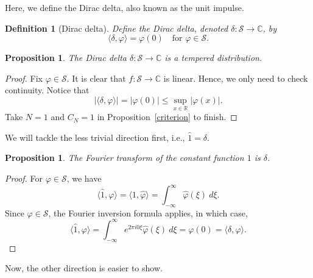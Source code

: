 \documentclass[12pt, letterpaper]{article}
\theoremstyle{plain}
\newtheorem{definition}[theorem]{Definition}
\newtheorem{proposition}[theorem]{Proposition}
\renewcommand{\phi}{\varphi}
\begin{document}
Here, we define the Dirac delta, also known as the unit impulse.

\begin{definition}[Dirac delta]
    Define the Dirac delta, denoted $\delta: \mathcal{S} \to \mathbb{C}$, by
    \begin{equation}
        \langle \delta, \phi \rangle = \phi(0) \quad \text{for } \phi \in \mathcal{S}.
    \end{equation}
\end{definition}

\begin{proposition}
    The Dirac delta $\delta: \mathcal{S} \to \mathbb{C}$ is a tempered distribution.
\end{proposition}

\begin{proof}
    Fix $\phi \in \mathcal{S}$. It is clear that $f: \mathcal{S} \to \mathbb{C}$ is linear. Hence, we only need to check continuity. Notice that
    \begin{equation}
        \vert \langle \delta, \phi \rangle \vert = \vert \phi(0) \vert \le \sup_{x \in \mathbb{R}} \vert \phi(x) \vert.
    \end{equation}
    Take $N = 1$ and $C_N = 1$ in Proposition~\ref{criterion} to finish.
\end{proof}

We will tackle the less trivial direction first, i.e., $\hat{1} = \delta$.

\begin{proposition}
    The Fourier transform of the constant function $1$ is $\delta$.
\end{proposition}

\begin{proof}
    For $\phi \in \mathcal{S}$, we have
    \begin{equation}
        \langle \hat{1}, \phi \rangle = \langle 1, \hat{\phi} \rangle = \int_{-\infty}^\infty \hat{\phi}(\xi) \ d\xi.
    \end{equation}
    Since $\phi \in \mathcal{S}$, the Fourier inversion formula applies, in which case,
    \begin{equation}
        \langle \hat{1}, \phi \rangle = \int_{-\infty}^\infty e^{2\pi i0\xi} \hat{\phi}(\xi) \ d\xi = \phi(0) = \langle \delta, \phi \rangle.
    \end{equation}
\end{proof}

Now, the other direction is easier to show.
\end{document}
